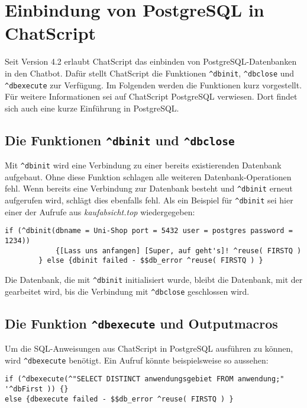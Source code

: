 \section{Einbindung von PostgreSQL in ChatScript}
\label{sec:Einbindung}
Seit Version 4.2 erlaubt ChatScript das einbinden von PostgreSQL-Datenbanken in den Chatbot. Dafür stellt ChatScript die Funktionen \lstinline|^dbinit|, \lstinline|^dbclose| und \lstinline|^dbexecute| zur Verfügung. Im Folgenden werden die Funktionen kurz vorgestellt. Für weitere Informationen sei auf \textcolor[rgb]{1,0,0}{ChatScript PostgreSQL} verwiesen. Dort findet sich auch eine kurze Einführung in PostgreSQL.


\subsection{Die Funktionen \lstinline|^dbinit| und \lstinline|^dbclose|}
\label{sec:dbinit}
Mit \lstinline|^dbinit| wird eine Verbindung zu einer bereits existierenden Datenbank aufgebaut. Ohne diese Funktion schlagen alle weiteren Datenbank-Operationen fehl. Wenn bereits eine Verbindung zur Datenbank besteht und \lstinline|^dbinit| erneut aufgerufen wird, schlägt dies ebenfalls fehl. Als ein Beispiel für \lstinline|^dbinit| sei hier einer der Aufrufe aus \textit{kaufabsicht.top} wiedergegeben:

\begin{lstlisting}[caption={Beispiel für \lstinline|^dbinit|}]
 if (^dbinit(dbname = Uni-Shop port = 5432 user = postgres password =  1234))
	        {[Lass uns anfangen] [Super, auf geht's]! ^reuse( FIRSTQ )
	    } else {dbinit failed - $$db_error ^reuse( FIRSTQ ) }
\end{lstlisting}

Die Datenbank, die mit \lstinline|^dbinit| initialisiert wurde, bleibt die Datenbank, mit der gearbeitet wird, bis die Verbindung mit \lstinline|^dbclose| geschlossen wird.\\

\subsection{Die Funktion \lstinline|^dbexecute| und Outputmacros}
\label{sec:dbexecute}

Um die SQL-Anweisungen aus ChatScript in  PostgreSQL ausführen zu können, wird \lstinline|^dbexecute| benötigt. Ein Aufruf könnte beispielsweise so aussehen:

\begin{lstlisting}[caption={Beispiel für \lstinline|^dbexecute|}]
if (^dbexecute(^"SELECT DISTINCT anwendungsgebiet FROM anwendung;" '^dbFirst )) {}
else {dbexecute failed - $$db_error ^reuse( FIRSTQ ) }
\end{lstlisting}

